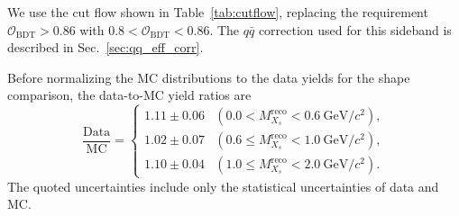 We use the cut flow shown in Table~\ref{tab:cutflow}, replacing the requirement $\mathcal{O}_{\textrm{BDT}}>0.86$ with $0.8<\mathcal{O}_{\textrm{BDT}}<0.86$.
The $q\bar{q}$ correction used for this sideband is described in Sec.~\ref{sec:qq_eff_corr}.

Before normalizing the MC distributions to the data yields for the shape comparison, the data-to-MC yield ratios are
\begin{equation}
\label{eq:fbdt_sideband_ratio}
    \frac{\textrm{Data}}{\textrm{MC}} =
    \begin{cases}
    1.11 \pm 0.06 &
    (0.0 < M_{X_{s}}^{\textrm{reco}} < 0.6~\textrm{GeV}/c^{2}), \\[10pt]
    1.02 \pm 0.07 &
    (0.6 \leq M_{X_{s}}^{\textrm{reco}} < 1.0~\textrm{GeV}/c^{2}), \\[10pt]
    1.10 \pm 0.04 &
    (1.0 \leq M_{X_{s}}^{\textrm{reco}} < 2.0~\textrm{GeV}/c^{2}).
    \end{cases}
\end{equation}
The quoted uncertainties include only the statistical uncertainties of data and MC.

